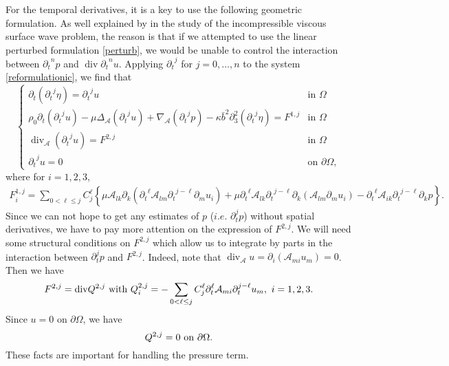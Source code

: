 \documentclass[a4paper,reqno,11pt]{amsart}
\numberwithin{equation}{section}
\begin{document}
For the temporal derivatives, it is a key to use the following geometric formulation. As well explained by \cite{GT_per} in the study of the incompressible viscous surface wave problem, the reason is that if we attempted to use the linear perturbed formulation \eqref{perturb}, we would be unable to control the interaction between ${\partial_t}^np$ and $\operatorname{div} {\partial_t}^n u$. Applying ${\partial_t}^j$ for $j=0,\dots,n$ to the system \eqref{reformulationic}, we find that
\begin{equation}\label{linear_geometric}
\begin{cases}
  {\partial_t} ({\partial_t}^j \eta) ={\partial_t}^j u  & \text{in } \Omega
\\  \rho_0{\partial_t} ({\partial_t}^j u) -\mu {\Delta_{\mathcal{A}}} ({\partial_t}^j u)+{{\nabla}_{\mathcal{A}}} ({\partial_t}^jp)- \kappa\bar b^2{\partial}_{3}^2({\partial_t}^j \eta) = F^{1,j}  & \text{in } \Omega \\
 {\operatorname{div}_{\mathcal{A}}} ({\partial_t}^j u) = F^{2,j} & \text{in } \Omega\\
{\partial_t}^j u  =0 & \text{on } {\partial}\Omega,
\end{cases}
\end{equation}
where for $i=1,2,3,$
\begin{equation}\label{F_def_start}
\begin{split}
 F_i^{1,j}  = \sum_{0 < \ell \le j}  C_j^\ell\left\{\mu
\mathcal{A}_{lk} {\partial}_k ( {\partial_t}^\ell  \mathcal{A}_{lm} {\partial_t}^{j-\ell}{\partial}_m u_i)
   +  \mu {\partial_t}^\ell \mathcal{A}_{lk}{\partial_t}^{j-\ell}{\partial}_k ( \mathcal{A}_{lm}{\partial}_m u_i) -  {\partial_t}^\ell  \mathcal{A}_{ik} {\partial_t}^{j-\ell}{\partial}_k p\right\}.
 \end{split}
\end{equation}
Since we can not hope to get any estimates of $p$ ($i.e.$ $\partial_t^j p$) without spatial derivatives, we have to pay more attention on the expression of $F^{2,j}$.  We will need some structural
conditions on $F^{2,j}$ which allow us to integrate by parts in the interaction between $\partial_t^j p$ and $F^{2,j}$. Indeed, note that $ {\operatorname{div}_{\mathcal{A}}} u={\partial}_i({\mathcal{A}}_{mi}u_m)=0$. Then we have
\begin{equation}\label{Qstr}
F^{2,j}= {\rm div}Q^{2,j}\text{ with }Q_i^{2,j}=
 -\sum_{0<\ell\le j}C_j^\ell\partial_t^\ell \mathcal{A}_{mi} \partial_t^{j-\ell}u_m,\ i=1,2,3.
 \end{equation}
Since $u=0$ on ${\partial}\Omega$, we have
\begin{equation}\label{Qstr1}
 Q^{2,j}=0\hbox{ on }{\partial}\Omega.\end{equation}
These facts are important for handling the pressure term.
\end{document}
